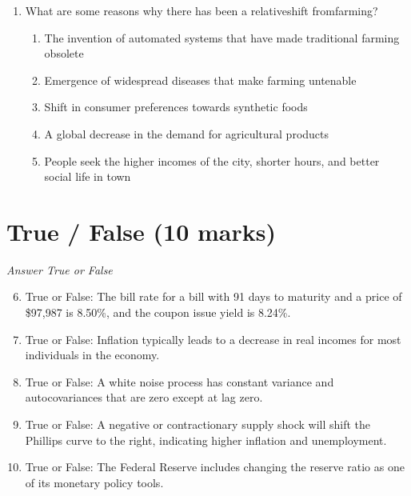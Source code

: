 \documentclass[12pt]{article}
\begin{document}
\begin{enumerate}[label=\arabic*.]
\begin{enumerate}[label=(\alph*)]
    \item saving remains constant.
    \item consumption decreases by more than \$X.
    \item saving increases by exactly \$X .
    \item saving increases by less than \$X .
    \item consumption decreases by less than \$X.
\end{enumerate}
\item What are some reasons why there has been a relativeshift fromfarming?
\begin{enumerate}[label=(\alph*)]
    \item The invention of automated systems that have made traditional farming obsolete
    \item Emergence of widespread diseases that make farming untenable
    \item Shift in consumer preferences towards synthetic foods
    \item A global decrease in the demand for agricultural products
    \item People seek the higher incomes of the city, shorter hours, and better social life in town
\end{enumerate}
\end{enumerate}

\section*{True / False (10 marks)}
\textit{Answer True or False}
\begin{enumerate}[label=\arabic*.]
\setcounter{enumi}{5}
\item True or False: The bill rate for a bill with 91 days to maturity and a price of \$97,987 is 8.50\%, and the coupon issue yield is 8.24\%.
\item True or False: Inflation typically leads to a decrease in real incomes for most individuals in the economy.
\item True or False: A white noise process has constant variance and autocovariances that are zero except at lag zero.
\item True or False: A negative or contractionary supply shock will shift the Phillips curve to the right, indicating higher inflation and unemployment.
\item True or False: The Federal Reserve includes changing the reserve ratio as one of its monetary policy tools.
\end{enumerate}
\end{document}
